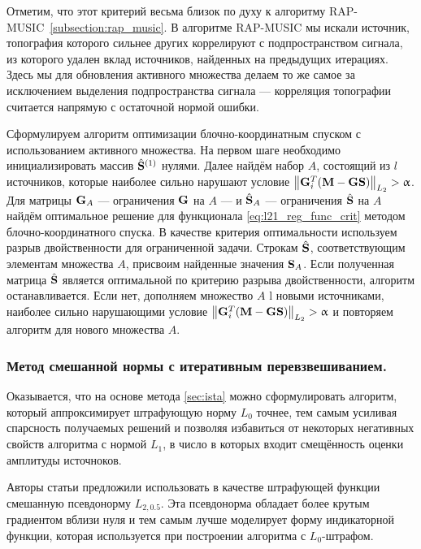 Отметим, что этот критерий весьма близок по духу к алгоритму RAP-MUSIC~\ref{subsection:rap_music}.
В алгоритме RAP-MUSIC мы искали источник, топография которого сильнее других коррелируют с подпространством сигнала,
из которого удален вклад источников, найденных на предыдущих итерациях. Здесь мы для обновления
активного множества делаем то же самое за исключением выделения подпространства сигнала ---
корреляция топографии считается напрямую с остаточной нормой ошибки.

Сформулируем алгоритм оптимизации блочно-координатным спуском с использованием
активного множества.
На первом шаге необходимо инициализировать массив
$\hat{\mathbf{S}}^{(1)}$ нулями. Далее найдём набор $A$, состоящий из $l$
источников, которые наиболее сильно нарушают условие
$\left\lVert\mathbf{G}_i^T(\mathbf{M} - \mathbf{G}\mathbf{S})\right\rVert_{L_2} > \upalpha$.
Для матрицы
$\mathbf{G}_{A}$ --- ограничения $\mathbf{G}$ на $A$ --- и $\hat{\mathbf{S}}_{A}$ --- ограничения
$\hat{\mathbf{S}}$ на $A$ найдём оптимальное решение для функционала \ref{eq:l21_reg_func_crit}
методом блочно-координатного спуска. В качестве критерия оптимальности используем
разрыв двойственности для ограниченной задачи. Строкам $\hat{\mathbf{S}}$, соответствующим
элементам множества $A$, присвоим найденные значения $\mathbf{S}_A$. Если
полученная матрица $\hat{\mathbf{S}}$ является оптимальной по критерию разрыва двойственности,
алгоритм останавливается. Если нет, дополняем множество $A$ l новыми источниками,
наиболее сильно нарушающими условие 
$\left\lVert\mathbf{G}_i^T(\mathbf{M} - \mathbf{G}\mathbf{S})\right\rVert_{L_2} > \upalpha$ и повторяем алгоритм для
нового множества $A$.

\subsubsection{Метод смешанной нормы с итеративным перевзвешиванием.}
Оказывается, что на основе метода \ref{sec:ista} %
можно сформулировать алгоритм, который аппроксимирует штрафующую норму $L_0$ точнее,
тем самым усиливая спарсность получаемых решений и позволяя избавиться
от некоторых негативных свойств алгоритма с нормой $L_{1}$, в число в которых
входит смещённость оценки амплитуды источноков.

Авторы статьи \cite{gramfort_2014} предложили использовать в качестве штрафующей
функции смешанную псевдонорму $L_{2, 0.5}$. Эта псевдонорма обладает более
крутым градиентом вблизи нуля и тем самым лучше моделирует форму индикаторной функции,
которая используется при построении алгоритма с $L_0$-штрафом.

